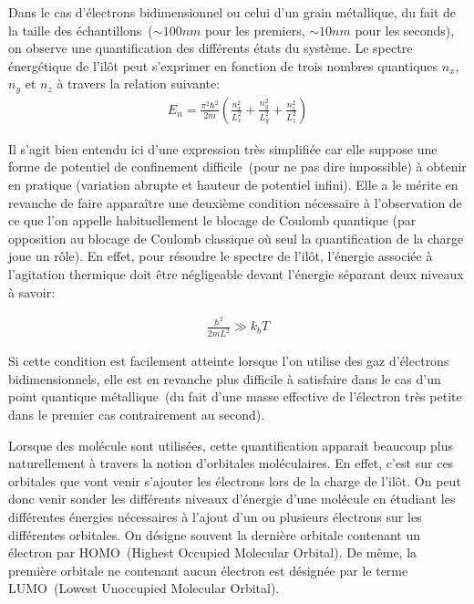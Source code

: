 Dans le cas d'électrons bidimensionnel ou celui d'un grain métallique, du fait de la taille des échantillons~($\sim 100nm$ pour les premiers, $\sim 10nm$ pour les seconds), on observe une quantification des différents états du système. Le spectre énergétique de l'il\^ot peut s'exprimer en fonction de trois nombres quantiques $n_x$, $n_y$ et $n_z$ à travers la relation suivante:
\begin{eqnarray}
E_n = \frac{\pi^2 \hbar^2}{2m}(\frac{n_x^2}{L_x^2} + \frac{n_y^2}{L_y^2} + \frac{n_z^2}{L_z^2}) \nonumber
\end{eqnarray}


Il s'agit bien entendu ici d'une expression très simplifiée car elle suppose une forme de potentiel de confinement difficile~(pour ne pas dire impossible) à obtenir en pratique (variation abrupte et hauteur de potentiel infini). Elle a le mérite en revanche de faire appara\^itre une deuxième condition nécessaire à l'observation de ce que l'on appelle habituellement le blocage de Coulomb quantique (par opposition au blocage de Coulomb classique où seul la quantification de la charge joue un rôle). En effet, pour résoudre le spectre de l'il\^ot, l'énergie associée à l'agitation thermique doit \^etre négligeable devant l'énergie séparant deux niveaux à savoir:

\begin{eqnarray}
\frac{\hbar^2}{2mL^2} \gg k_bT \nonumber
\end{eqnarray}

Si cette condition est facilement atteinte lorsque l'on utilise des gaz d'électrons bidimensionnels, elle est en revanche plus difficile à satisfaire dans le cas d'un point quantique métallique~(du fait d'une masse effective de l'électron très petite dans le premier cas contrairement au second). \newline


Lorsque des molécule sont utilisées, cette quantification apparait beaucoup plus naturellement à travers la notion d'orbitales moléculaires. En effet, c'est sur ces orbitales que vont venir s'ajouter les électrons lors de la charge de l'il\^ot. On peut donc venir sonder les différents niveaux d'énergie d'une molécule en étudiant les différentes énergies nécessaires à l'ajout d'un ou plusieurs électrons sur les différentes orbitales. On désigne souvent la dernière orbitale contenant un électron par HOMO~(Highest Occupied Molecular Orbital). De même, la première orbitale ne contenant aucun électron est désignée par le terme LUMO~(Lowest Unoccupied Molecular Orbital).

